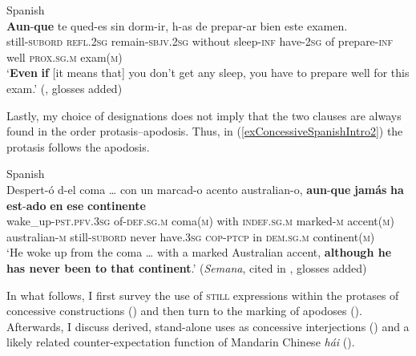 \begin{exe}
	\ex Spanish\label{exConcessiveSpanishIntro3}\\
	\gll \textbf{Aun}-\textbf{que} te qued-es sin dorm-ir, h-as de prepar-ar bien este examen.\\
	still-\textsc{subord} \textsc{refl}.2\textsc{sg} remain-\textsc{sbjv}.2\textsc{sg} without sleep-\textsc{inf} have-2\textsc{sg} of prepare-\textsc{inf} well \textsc{prox}.\textsc{sg}.\textsc{m} exam(\textsc{m})\\
	\glt \lq \textbf{Even} \textbf{if} [it means that]  you don't get any sleep, you have to prepare well for this exam.' (\cite[§47.12e]{RAEGramatica}, glosses added)
\end{exe}

Lastly, my choice of designations does not imply that the two clauses are always found in the order protasis–apodosis. Thus, in (\ref{exConcessiveSpanishIntro2}) the protasis follows the apodosis.

\begin{exe}
	\ex Spanish\label{exConcessiveSpanishIntro2}\\
	\gll Despert-ó d-el coma … con un marcad-o acento australian-o, \textbf{aun}-\textbf{que} \textbf{jamás} \textbf{ha} \textbf{est}-\textbf{ado} \textbf{en} \textbf{ese} \textbf{continente}\\
wake\_up-\textsc{pst}.\textsc{pfv}.3\textsc{sg} of-\textsc{def}.\textsc{sg}.\textsc{m} coma(\textsc{m}) {} with \textsc{indef}.\textsc{sg}.\textsc{m} marked-\textsc{m} accent(\textsc{m}) australian-\textsc{m} still-\textsc{subord} never have.3\textsc{sg} \textsc{cop}-\textsc{ptcp} in \textsc{dem}.\textsc{sg}.\textsc{m} continent(\textsc{m})\\
	\glt \lq He woke up from the coma … with a marked Australian accent,  \textbf{although he has never been to that continent}.' (\textit{Semana}, cited in \cite[47.12t]{RAEGramatica}, glosses added)
\end{exe}

In what follows, I first survey the use of \textsc{still} expressions within the protases of concessive constructions () and then turn to the marking of apodoses (). Afterwards, I discuss derived, stand-alone uses as concessive interjections () and a likely related counter-expectation function of Mandarin Chinese \textit{hái} ().
